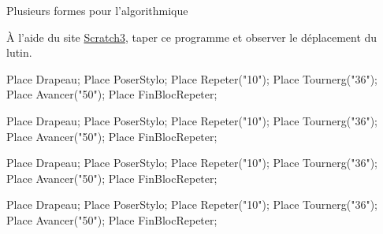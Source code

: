 \begin{exercice}
    Plusieurs formes pour l'algorithmique

    \partie
    À l'aide du site \href{https://scratch.mit.edu/projects/editor/?tutorial=getStarted}{Scratch3}, taper ce programme et
   observer le déplacement du lutin.

    \begin{Scratch}
        Place Drapeau;
        Place PoserStylo;
        Place Repeter("10");
        Place Tournerg("36");
        Place Avancer("50");
        Place FinBlocRepeter;
    \end{Scratch}

    \partie
    \begin{Scratch}[Numerotation]
        Place Drapeau;
        Place PoserStylo;
        Place Repeter("10");
        Place Tournerg("36");
        Place Avancer("50");
        Place FinBlocRepeter;
    \end{Scratch}

    \partie
    \begin{Scratch}[Naturel]
        Place Drapeau;
        Place PoserStylo;
        Place Repeter("10");
        Place Tournerg("36");
        Place Avancer("50");
        Place FinBlocRepeter;
    \end{Scratch}

    \partie
    \begin{Scratch}
        Place Drapeau;
        Place PoserStylo;
        Place Repeter("10");
        Place Tournerg("36");
        Place Avancer("50");
        Place FinBlocRepeter;
    \end{Scratch}
\end{exercice}
